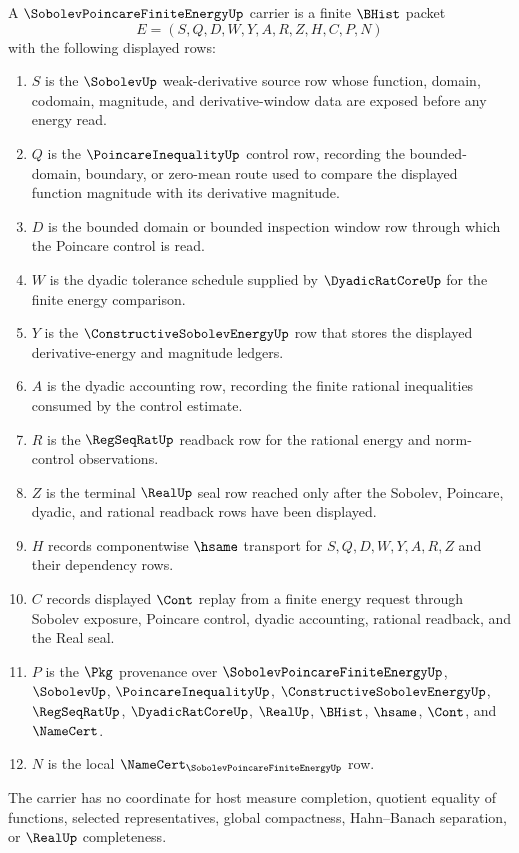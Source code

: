\begin{definition}
\label{def:sobolev-poincare-finite-energy-carrier}
A $\SobolevPoincareFiniteEnergyUp$ carrier is a finite $\BHist$ packet
$$
E=(S,Q,D,W,Y,A,R,Z,H,C,P,N)
$$
with the following displayed rows:
\begin{enumerate}
\item $S$ is the $\SobolevUp$ weak-derivative source row whose function, domain, codomain, magnitude, and derivative-window data are exposed before any energy read.
\item $Q$ is the $\PoincareInequalityUp$ control row, recording the bounded-domain, boundary, or zero-mean route used to compare the displayed function magnitude with its derivative magnitude.
\item $D$ is the bounded domain or bounded inspection window row through which the Poincare control is read.
\item $W$ is the dyadic tolerance schedule supplied by $\DyadicRatCoreUp$ for the finite energy comparison.
\item $Y$ is the $\ConstructiveSobolevEnergyUp$ row that stores the displayed derivative-energy and magnitude ledgers.
\item $A$ is the dyadic accounting row, recording the finite rational inequalities consumed by the control estimate.
\item $R$ is the $\RegSeqRatUp$ readback row for the rational energy and norm-control observations.
\item $Z$ is the terminal $\RealUp$ seal row reached only after the Sobolev, Poincare, dyadic, and rational readback rows have been displayed.
\item $H$ records componentwise $\hsame$ transport for $S,Q,D,W,Y,A,R,Z$ and their dependency rows.
\item $C$ records displayed $\Cont$ replay from a finite energy request through Sobolev exposure, Poincare control, dyadic accounting, rational readback, and the Real seal.
\item $P$ is the $\Pkg$ provenance over $\SobolevPoincareFiniteEnergyUp$, $\SobolevUp$, $\PoincareInequalityUp$, $\ConstructiveSobolevEnergyUp$, $\RegSeqRatUp$, $\DyadicRatCoreUp$, $\RealUp$, $\BHist$, $\hsame$, $\Cont$, and $\NameCert$.
\item $N$ is the local $\NameCert_{\SobolevPoincareFiniteEnergyUp}$ row.
\end{enumerate}
The carrier has no coordinate for host measure completion, quotient equality of functions, selected representatives, global compactness, Hahn--Banach separation, or $\RealUp$ completeness.
\end{definition}

